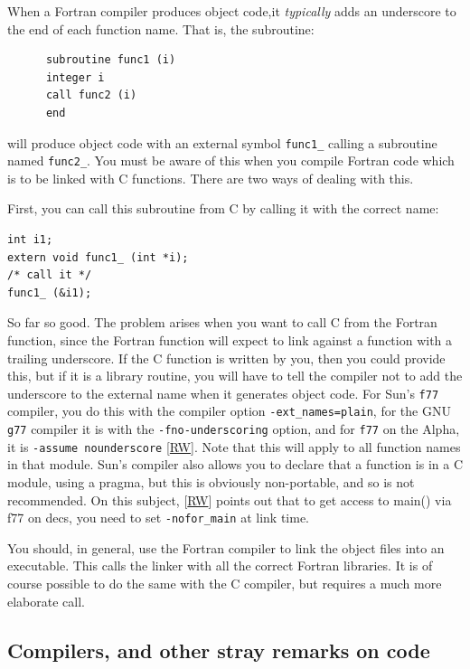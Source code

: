 \documentclass[11pt,oneside,chapters]{starlink}
\begin{document}
When a Fortran compiler produces object code,it
\emph{typically} adds an underscore to the end of each
function name.  That is, the subroutine:

\begin{verbatim}
      subroutine func1 (i)
      integer i
      call func2 (i)
      end
\end{verbatim}

will produce object code with an external symbol
\texttt{func1\_} calling a subroutine named
\texttt{func2\_}.  You must be aware of this when you
compile Fortran code which is to be linked with C
functions.  There are two ways of dealing with this.

First, you can call this subroutine from C by calling
it with the correct name:

\begin{verbatim}
int i1;
extern void func1_ (int *i);
/* call it */
func1_ (&i1);
\end{verbatim}

So far so good.  The problem arises when you want to
call C from the Fortran function, since the Fortran
function will expect to link against a function with a
trailing underscore.  If the C function is written by
you, then you could provide this, but if it is a library
routine, you will have to tell the compiler not to add
the underscore to the external name when it generates
object code.  For Sun's \texttt{f77} compiler, you
do this with the compiler option
\texttt{-ext\_names=plain}, for the GNU
\texttt{g77} compiler it is with the
\texttt{-fno-underscoring} option, and for
\texttt{f77} on the Alpha, it is \texttt{-assume nounderscore}
[\hyperlink{ta:rw}{RW}].  Note
that this will apply to all function names in that
module.  Sun's compiler also allows you to declare that
a function is in a C module, using a pragma, but this is
obviously non-portable, and so is not recommended.  On
this subject, [\hyperlink{ta:rw}{RW}] points out that
to get access to main() via f77 on decs, you need to set
\texttt{-nofor\_main} at link time.

You should, in general, use the Fortran compiler to
link the object files into an executable.  This calls
the linker with all the correct Fortran libraries.  It
is of course possible to do the same with the C
compiler, but requires a much more elaborate call.


\subsection{Compilers, and other stray remarks on code}
\label{s:compilers}
\end{document}
